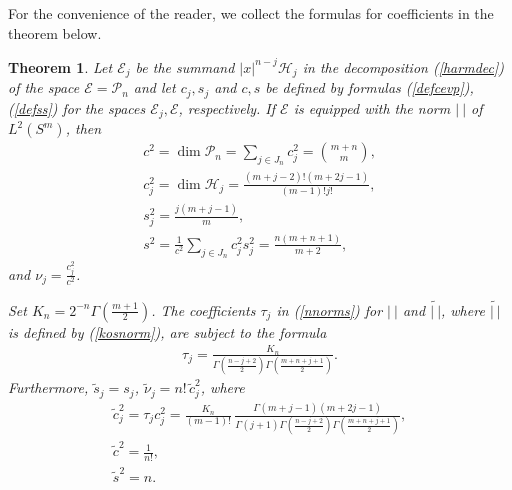 \documentclass[10pt]{amsart}
\newtheorem{theorem}{Theorem}
\theoremstyle{remark}
\let\td=\tilde
\let\wtd=\widetilde
\begin{document}
For the convenience of the reader, we collect the formulas for
coefficients in the theorem below.
\begin{theorem}\label{kss-l2}
Let ${\mathcal{E}}_j$ be the summand $|x|^{n-j}{\mathcal{H}}_{j}$ in the decomposition
(\ref{harmdec}) of the space ${\mathcal{E}}={\mathcal{P}}_n$ and let $c_j,s_j$ and
$c,s$ be defined by formulas (\ref{defcevp}), (\ref{defss}) for
the spaces ${\mathcal{E}}_j,{\mathcal{E}}$, respectively. If ${\mathcal{E}}$ is equipped with
the norm $|\ |$ of $L^2(S^m)$, then
\begin{eqnarray}
c^2=\dim{\mathcal{P}}_n=\sum_{j\in J_n}c_j^2={{m+n}\choose{m}}
\label{csqua},\\
c_j^2=\dim{\mathcal{H}}_{j}=\frac{(m+j-2)!(m+2j-1)}{(m-1)!j!},
\label{cksqua}\\
s_j^2=\frac{j(m+j-1)}{m}\label{snmtk},\\
s^2=\frac{1}{c^2} \sum_{j\in J_n}c_j^2s_j^2
=\frac{n(m+n+1)}{m+2}\label{sjsqu},
\end{eqnarray}
and $\nu_j=\frac{c_j^2}{c^2}$.

Set $K_n=2^{-n}{{\mathord{\Gamma}}}\left(\frac{m+1}{2}\right)$. The coefficients
$\tau_j$ in (\ref{nnorms}) for $|\ |$ and $\wtd{|\ |}$, where
$\wtd{|\ |}$ is defined by (\ref{kosnorm}), are subject to the
formula
\begin{eqnarray}\label{ftauj}
\tau_j=\frac{K_n}{{{\mathord{\Gamma}}}\left(\frac{n-j+2}{2}\right)
{{\mathord{\Gamma}}}\left(\frac{m+n+j+1}{2}\right)}.
\end{eqnarray}
Furthermore, $\td s_j=s_j$,      $\td\nu_j=n!\,\td c_j^2$, where
\begin{eqnarray}
\td c_j^2=\tau_j c_j^2=
\frac{K_n}{(m-1)!}\,\frac{{{\mathord{\Gamma}}}(m+j-1)(m+2j-1)}
{{{\mathord{\Gamma}}}\left(j+1\right){{\mathord{\Gamma}}}\left(\frac{n-j+2}{2}\right)
{{\mathord{\Gamma}}}\left(\frac{m+n+j+1}{2}\right)},\nonumber\\
\td c^2=\frac{1}{n!},\label{tdc}\\
\td s^2=n\label{tds}.
\end{eqnarray}
\end{theorem}
\end{document}
